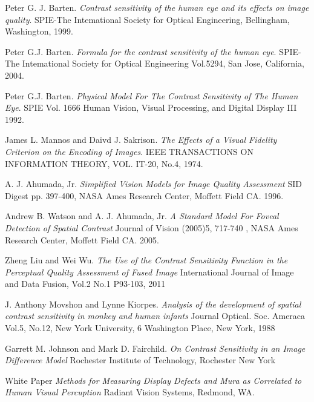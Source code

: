 \documentclass{article}
\begin{document}
\clearpage
\begin{thebibliography}{8}
Peter G. J. Barten. 
\textit{Contrast sensitivity of the human eye and its effects on image quality}. 
SPIE-The Intemational Society for Optical Engineering, Bellingham, Washington, 1999.

Peter G.J. Barten.
\textit{Formula for the contrast sensitivity of the human eye}.
SPIE-The Intemational Society for Optical Engineering Vol.5294, San Jose, California, 2004.

Peter G.J. Barten.
\textit{Physical Model For The Contrast Sensitivity of The Human Eye}.
SPIE Vol. 1666 Human Vision, Visual Processing, and Digital Display III 1992.

James L. Mannos and Daivd J. Sakrison.
\textit{The Effects of a Visual Fidelity Criterion on the Encoding of Images}.
IEEE TRANSACTIONS ON INFORMATION THEORY, VOL. IT-20, No.4, 1974.

A. J. Ahumada, Jr.
\textit{Simplified Vision Models for Image Quality Assessment}
SID Digest pp. 397-400, NASA Ames Research Center, Moffett Field CA. 1996.

Andrew B. Watson and A. J. Ahumada, Jr.
\textit{A Standard Model For Foveal Detection of Spatial Contrast}
Journal of Vision (2005)5, 717-740 , NASA Ames Research Center, Moffett Field CA. 2005.

Zheng Liu and Wei Wu.
\textit{The Use of the Contrast Sensitivity Function in the Perceptual Quality Assessment of Fused Image}
International Journal of Image and Data Fusion, Vol.2 No.1 P93-103, 2011

J. Anthony Movshon and Lynne Kiorpes.
\textit{Analysis of the development of spatial contrast sensitivity in monkey and human infants}
Journal Optical. Soc. Ameraca Vol.5, No.12, New York University, 6 Washington Place, New York, 1988

Garrett M. Johnson and Mark D. Fairchild.
\textit{On Contrast Sensitivity in an Image Difference Model}
Rochester Institute of Technology, Rochester New York

White Paper
\textit{Methods for Measuring Display Defects and Mura as Correlated to Human Visual Percuption}
Radiant Vision Systems, Redmond, WA.

\end{thebibliography}
\end{document}
